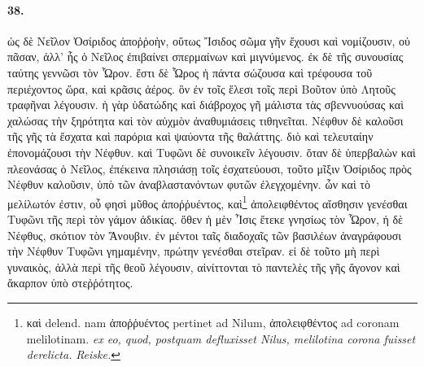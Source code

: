 \documentclass[a4paper, 11pt, oneside, polutonikogreek, german, landscape]{article}
\begin{document}
\paragraph{38.}
ὡς δὲ Νεῖλον Ὀσίριδος ἀποῤῥοὴν, οὕτως Ἴσιδος σῶμα γῆν ἔχουσι καὶ νομίζουσιν, οὐ πᾶσαν, ἀλλ' ἧς ὁ Νεῖλος ἐπιβαίνει σπερμαίνων καὶ μιγνύμενος. ἐκ δὲ τῆς συνουσίας ταύτης γεννῶσι τὸν Ὧρον. ἔστι δὲ Ὧρος ἡ πάντα σώζουσα καὶ τρέφουσα τοῦ περιέχοντος ὥρα, καὶ κρᾶσις ἀέρος. ὃν ἐν τοῖς ἕλεσι τοῖς περὶ Βοῦτον ὑπὸ Λητοῦς τραφῆναι λέγουσιν. ἡ γὰρ ὑδατώδης καὶ διάβροχος γῆ μάλιστα τὰς σβεννυούσας καὶ χαλώσας τὴν ξηρότητα καὶ τὸν αὐχμὸν ἀναθυμιάσεις τιθηνεῖται. Νέφθυν δὲ καλοῦσι τῆς γῆς τὰ ἔσχατα καὶ παρόρια καὶ ψαύοντα τῆς θαλάττης. διὸ καὶ τελευταίην ἐπονομάζουσι τὴν Νέφθυν. καὶ Τυφῶνι δὲ συνοικεῖν λέγουσιν. ὅταν δὲ ὑπερβαλὼν καὶ πλεονάσας ὁ Νεῖλος, ἐπέκεινα πλησιάσῃ τοῖς ἐσχατεύουσι, τοῦτο μῖξιν Ὀσίριδος πρὸς Νέφθυν καλοῦσιν, ὑπὸ τῶν ἀναβλαστανόντων φυτῶν ἐλεγχομένην. ὧν καὶ τὸ μελίλωτόν ἐστιν, οὗ φησὶ μῦθος ἀποῤῥυέντος, καὶ\footnote{καὶ delend. nam ἀποῤῥυέντος pertinet ad Nilum, ἀπολειφθέντος ad coronam melilotinam. \emph{ex eo, quod, postquam defluxisset Nilus, melilotina corona fuisset derelicta.} \emph{Reiske.}} ἀπολειφθέντος αἴσθησιν γενέσθαι Τυφῶνι τῆς περὶ τὸν γάμον ἀδικίας. ὅθεν ἡ μὲν Ἶσις ἔτεκε γνησίως τὸν Ὧρον, ἡ δὲ Νέφθυς, σκότιον τὸν Ἄνουβιν. ἐν μέντοι ταῖς διαδοχαῖς τῶν βασιλέων ἀναγράφουσι τὴν Νέφθυν Τυφῶνι γημαμένην, πρώτην γενέσθαι στεῖραν. εἰ δὲ τοῦτο μὴ περὶ γυναικὸς, ἀλλὰ περὶ τῆς θεοῦ λέγουσιν, αἰνίττονται τὸ παντελὲς τῆς γῆς ἄγονον καὶ ἄκαρπον ὑπὸ στεῤῥότητος.
\end{document}
